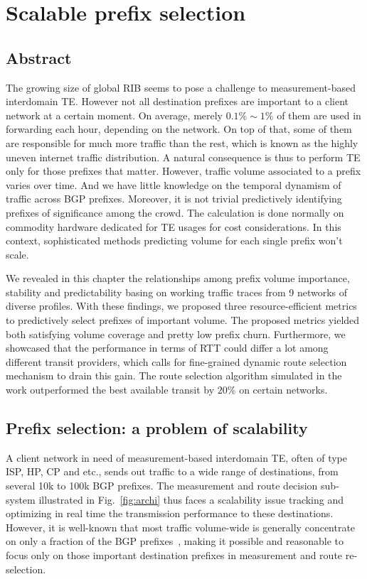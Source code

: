 \chapter{Scalable prefix selection}
\label{sec:pref_selec}

\section*{Abstract}
The growing size of global \acf{RIB} seems to pose a challenge to measurement-based interdomain \acf{TE}. However not all destination prefixes are important to a client network at a certain moment. On average, merely $0.1\% \sim 1\%$ of them are used in forwarding each hour, depending on the network. On top of that, some of them are responsible for much more traffic than the rest, which is known as the highly uneven internet traffic distribution.
A natural consequence is thus to perform TE only for those prefixes that matter.
However, traffic volume associated to a prefix varies over time. And we have little knowledge on the temporal dynamism of traffic across \acf{BGP} prefixes. 
Moreover, it is not trivial predictively identifying prefixes of significance among the crowd.
The calculation is done normally on commodity hardware dedicated for \ac{TE} usages for cost considerations.
In this context, sophisticated methods predicting volume for each single prefix won't scale.

We revealed in this chapter the relationships among prefix volume importance, stability and predictability basing on working traffic traces from 9 networks of diverse profiles. 
With these findings, we proposed three resource-efficient metrics to predictively select prefixes of important volume. The proposed metrics yielded both satisfying volume coverage and pretty low prefix churn. Furthermore, we showcased that the performance in terms of RTT could differ a lot among different transit providers, which calls for fine-grained dynamic route selection mechanism to drain this gain. The route selection algorithm simulated in the work outperformed the best available transit by $20\%$ on certain networks. 
\clearpage

\section{Prefix selection: a problem of scalability}
A client network in need of measurement-based interdomain \acf{TE}, often of type \acf{ISP}, \acf{HP}, \acf{CP} and etc., sends out traffic to a wide range of destinations, from several 10k to 100k BGP prefixes.
The measurement and route decision sub-system illustrated in Fig.~\ref{fig:archi} thus faces a scalability issue tracking and optimizing in real time the transmission performance to these destinations.
However, it is well-known that most traffic volume-wide is generally concentrate on only a fraction of the BGP prefixes~\cite{Fang1999, Feamster2003, Papagiannaki2005, Sarrar2012}, 
making it possible and reasonable to focus only on those important destination prefixes in measurement and route re-selection. 


